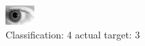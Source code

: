 \begin{figure}[h!]
\begin{center}
\includegraphics[width=0.60\columnwidth]{figures/ID317_class_4_target_3.png}
\end{center}
\caption{ Classification: 4 actual target: 3}
\label{fig:ID317_class_4_target_3}
\end{figure}
